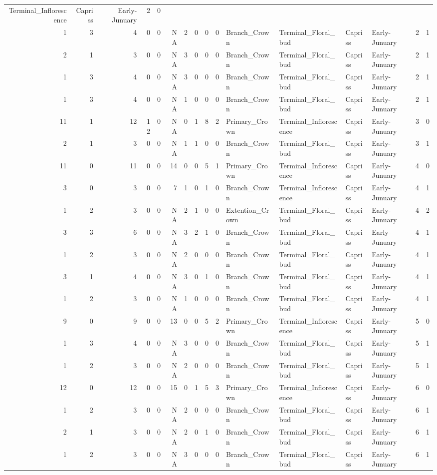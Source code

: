 \documentclass[]{article}
\begin{document}
\begin{longtable}[]{@{}rrrrrrrrrrllllrl@{}}
Terminal\_Inflorescence & Capriss & Early-Junuary & 2 & 0\tabularnewline
1 & 3 & 4 & 0 & 0 & NA & 2 & 0 & 0 & 0 & Branch\_Crown &
Terminal\_Floral\_bud & Capriss & Early-Junuary & 2 & 1\tabularnewline
2 & 1 & 3 & 0 & 0 & NA & 3 & 0 & 0 & 0 & Branch\_Crown &
Terminal\_Floral\_bud & Capriss & Early-Junuary & 2 & 1\tabularnewline
1 & 3 & 4 & 0 & 0 & NA & 3 & 0 & 0 & 0 & Branch\_Crown &
Terminal\_Floral\_bud & Capriss & Early-Junuary & 2 & 1\tabularnewline
1 & 3 & 4 & 0 & 0 & NA & 1 & 0 & 0 & 0 & Branch\_Crown &
Terminal\_Floral\_bud & Capriss & Early-Junuary & 2 & 1\tabularnewline
11 & 1 & 12 & 12 & 0 & NA & 0 & 1 & 8 & 2 & Primary\_Crown &
Terminal\_Inflorescence & Capriss & Early-Junuary & 3 & 0\tabularnewline
2 & 1 & 3 & 0 & 0 & NA & 1 & 1 & 0 & 0 & Branch\_Crown &
Terminal\_Floral\_bud & Capriss & Early-Junuary & 3 & 1\tabularnewline
11 & 0 & 11 & 0 & 0 & 14 & 0 & 0 & 5 & 1 & Primary\_Crown &
Terminal\_Inflorescence & Capriss & Early-Junuary & 4 & 0\tabularnewline
3 & 0 & 3 & 0 & 0 & 7 & 1 & 0 & 1 & 0 & Branch\_Crown &
Terminal\_Inflorescence & Capriss & Early-Junuary & 4 & 1\tabularnewline
1 & 2 & 3 & 0 & 0 & NA & 2 & 1 & 0 & 0 & Extention\_Crown &
Terminal\_Floral\_bud & Capriss & Early-Junuary & 4 & 2\tabularnewline
3 & 3 & 6 & 0 & 0 & NA & 3 & 2 & 1 & 0 & Branch\_Crown &
Terminal\_Floral\_bud & Capriss & Early-Junuary & 4 & 1\tabularnewline
1 & 2 & 3 & 0 & 0 & NA & 2 & 0 & 0 & 0 & Branch\_Crown &
Terminal\_Floral\_bud & Capriss & Early-Junuary & 4 & 1\tabularnewline
3 & 1 & 4 & 0 & 0 & NA & 3 & 0 & 1 & 0 & Branch\_Crown &
Terminal\_Floral\_bud & Capriss & Early-Junuary & 4 & 1\tabularnewline
1 & 2 & 3 & 0 & 0 & NA & 1 & 0 & 0 & 0 & Branch\_Crown &
Terminal\_Floral\_bud & Capriss & Early-Junuary & 4 & 1\tabularnewline
9 & 0 & 9 & 0 & 0 & 13 & 0 & 0 & 5 & 2 & Primary\_Crown &
Terminal\_Inflorescence & Capriss & Early-Junuary & 5 & 0\tabularnewline
1 & 3 & 4 & 0 & 0 & NA & 3 & 0 & 0 & 0 & Branch\_Crown &
Terminal\_Floral\_bud & Capriss & Early-Junuary & 5 & 1\tabularnewline
1 & 2 & 3 & 0 & 0 & NA & 2 & 0 & 0 & 0 & Branch\_Crown &
Terminal\_Floral\_bud & Capriss & Early-Junuary & 5 & 1\tabularnewline
12 & 0 & 12 & 0 & 0 & 15 & 0 & 1 & 5 & 3 & Primary\_Crown &
Terminal\_Inflorescence & Capriss & Early-Junuary & 6 & 0\tabularnewline
1 & 2 & 3 & 0 & 0 & NA & 2 & 0 & 0 & 0 & Branch\_Crown &
Terminal\_Floral\_bud & Capriss & Early-Junuary & 6 & 1\tabularnewline
2 & 1 & 3 & 0 & 0 & NA & 2 & 0 & 1 & 0 & Branch\_Crown &
Terminal\_Floral\_bud & Capriss & Early-Junuary & 6 & 1\tabularnewline
1 & 2 & 3 & 0 & 0 & NA & 3 & 0 & 0 & 0 & Branch\_Crown &
Terminal\_Floral\_bud & Capriss & Early-Junuary & 6 & 1\tabularnewline

\end{longtable}
\end{document}
